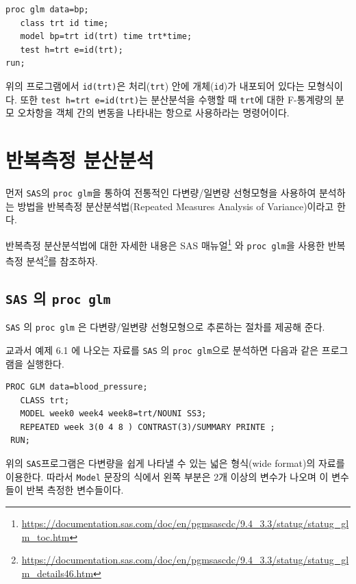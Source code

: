 \documentclass[
]{book}
\renewcommand{\href}[2]{#2\footnote{\url{#1}}}
\theoremstyle{definition}
\theoremstyle{definition}
\theoremstyle{definition}
\theoremstyle{remark}
\begin{document}
\begin{verbatim}
proc glm data=bp;
   class trt id time;
   model bp=trt id(trt) time trt*time;
   test h=trt e=id(trt);
run;
\end{verbatim}

위의 프로그램에서 \texttt{id(trt)}은 처리(\texttt{trt}) 안에 개체(\texttt{id})가 내포되어 있다는 모형식이다. 또한 \texttt{test\ h=trt\ e=id(trt)}는 분산분석을 수행할 때 \texttt{trt}에 대한 F-통계량의 분모 오차항을 객체 간의 변동을 나타내는 항으로 사용하라는 명령어이다.

\hypertarget{uxbc18uxbcf5uxce21uxc815-uxbd84uxc0b0uxbd84uxc11d}{%
\section{반복측정 분산분석}\label{uxbc18uxbcf5uxce21uxc815-uxbd84uxc0b0uxbd84uxc11d}}

먼저 \texttt{SAS}의 \texttt{proc\ glm}을 통하여 전통적인 다변량/일변량 선형모형을 사용하여 분석하는 방법을 반복측정 분산분석법(Repeated Measures Analysis of Variance)이라고 한다.

반복측정 분산분석법에 대한 자세한 내용은 \href{https://documentation.sas.com/doc/en/pgmsascdc/9.4_3.3/statug/statug_glm_toc.htm}{SAS 매뉴얼} 와 \href{https://documentation.sas.com/doc/en/pgmsascdc/9.4_3.3/statug/statug_glm_details46.htm}{\texttt{proc\ glm}을 사용한 반복측정 분석}를 참조하자.

\hypertarget{sas-uxc758-proc-glm}{%
\subsection{\texorpdfstring{\texttt{SAS} 의 \texttt{proc\ glm}}{SAS 의 proc glm}}\label{sas-uxc758-proc-glm}}

\texttt{SAS} 의 \texttt{proc\ glm} 은 다변량/일변량 선형모형으로 추론하는 절차를 제공해 준다.

교과서 예제 6.1 에 나오는 자료를 \texttt{SAS} 의 \texttt{proc\ glm}으로 분석하면 다음과 같은 프로그램을 실행한다.

\begin{verbatim}
PROC GLM data=blood_pressure;
   CLASS trt;
   MODEL week0 week4 week8=trt/NOUNI SS3;
   REPEATED week 3(0 4 8 ) CONTRAST(3)/SUMMARY PRINTE ;
 RUN;
\end{verbatim}

위의 \texttt{SAS}프로그램은 다변량을 쉽게 나타낼 수 있는 넓은 형식(wide format)의 자료를 이용한다. 따라서 \texttt{Model} 문장의 식에서 왼쪽 부분은 2개 이상의 변수가 나오며 이 변수들이 반복 측정한 변수들이다.
\end{document}
